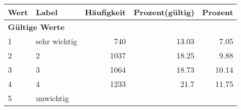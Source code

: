      \begin{longtable}{lXrrr}
     \toprule
     \textbf{Wert} & \textbf{Label} & \textbf{Häufigkeit} & \textbf{Prozent(gültig)} & \textbf{Prozent} \\
     \endhead
     \midrule
     \multicolumn{5}{l}{\textbf{Gültige Werte}}\\

     1 &
     \multicolumn{1}{X}{ sehr wichtig   } &


       \num{740} &
       \num[round-mode=places,round-precision=2]{13.03} &
         \num[round-mode=places,round-precision=2]{7.05} \\

     2 &
     \multicolumn{1}{X}{ 2   } &


       \num{1037} &
       \num[round-mode=places,round-precision=2]{18.25} &
         \num[round-mode=places,round-precision=2]{9.88} \\

     3 &
     \multicolumn{1}{X}{ 3   } &


       \num{1064} &
       \num[round-mode=places,round-precision=2]{18.73} &
         \num[round-mode=places,round-precision=2]{10.14} \\

     4 &
     \multicolumn{1}{X}{ 4   } &


       \num{1233} &
       \num[round-mode=places,round-precision=2]{21.7} &
         \num[round-mode=places,round-precision=2]{11.75} \\

     5 &
     \multicolumn{1}{X}{ unwichtig   } &



\end{longtable}
